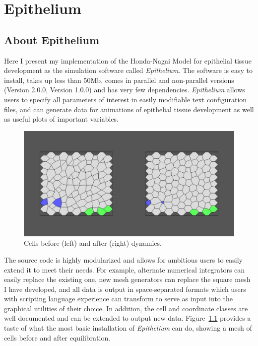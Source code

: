 \chapter{Epithelium}
\label{chap:Epithelium}
\section{About Epithelium}
Here I present my implementation of the Honda-Nagai Model for epithelial tissue development as the simulation software called \emph{Epithelium}. The software is easy to install, takes up less than 50Mb, comes in parallel and non-parallel versions (Version 2.0.0, Version 1.0.0) and has very few dependencies. \emph{Epithelium} allows users to specify all parameters of interest in easily modifiable text configuration files, and can generate data for animations of epithelial tissue development as well as useful plots of important variables. 

\begin{figure}
\centering
\includegraphics[width=\textwidth]{../diagrams/BeforeAfter.png}
\caption{Cells before (left) and after (right) dynamics.}
\label{fig:beforeafter}
\end{figure}

The source code is highly modularized and allows for ambitious users to easily extend it to meet their needs. For example, alternate numerical integrators can easily replace the existing one, new mesh generators can replace the square mesh I have developed, and all data is output in space-separated formats which users with scripting language experience can transform to serve as input into the graphical utilities of their choice. In addition, the cell and coordinate classes are well documented and can be extended to output new data. Figure~\ref{fig:beforeafter} provides a taste of what the most basic installation of \emph{Epithelium} can do, showing a mesh of cells before and after equilibration.

